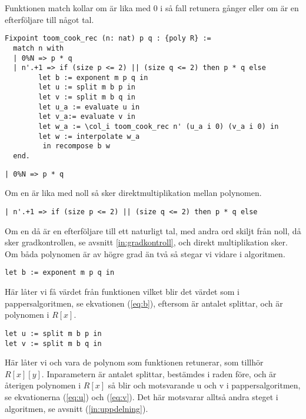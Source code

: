 Funktionen match kollar om  är lika med 0 i så fall retunera  gånger
 eller om  är en efterföljare till något tal.


\begin{lstlisting}
Fixpoint toom_cook_rec (n: nat) p q : {poly R} :=
  match n with
  | 0%N => p * q
  | n'.+1 => if (size p <= 2) || (size q <= 2) then p * q else
        let b := exponent m p q in
        let u := split m b p in
        let v := split m b q in
        let u_a := evaluate u in
        let v_a:= evaluate v in
        let w_a := \col_i toom_cook_rec n' (u_a i 0) (v_a i 0) in
        let w := interpolate w_a
         in recompose b w
  end.
\end{lstlisting}

\begin{lstlisting}
| 0%N => p * q
\end{lstlisting}

Om en  är lika med noll så sker direktmultiplikation mellan polynomen.

\begin{lstlisting}
| n'.+1 => if (size p <= 2) || (size q <= 2) then p * q else
\end{lstlisting}

Om en  då är en efterföljare till ett naturligt tal, med andra ord skiljt
från noll, då sker gradkontrollen, se avsnitt \ref{in:gradkontroll}, och direkt
multiplikation sker. Om båda polynomen är av högre grad än två så stegar vi
vidare i algoritmen.

\begin{lstlisting}
let b := exponent m p q in
\end{lstlisting}

Här låter vi  få värdet från funktionen  vilket blir det
värdet som i pappersalgoritmen, se ekvationen (\ref{eq:b}), eftersom  är
antalet splittar,  och  är polynomen i $R[x]$.

\begin{lstlisting}
let u := split m b p in
let v := split m b q in
\end{lstlisting}

Här låter vi  och  vara de polynom som funktionen 
retunerar, som tillhör $R[x][y]$. Inparametern  är antalet splittar, 
bestämdes i raden före,  och  är återigen polynomen i $R[x]$ så blir 
 och  motsvarande u och v i pappersalgoritmen, se ekvationerna
(\ref{eq:u}) och (\ref{eq:v}). Det här motsvarar alltså andra steget i
algoritmen, se avsnitt (\ref{in:uppdelning}).

